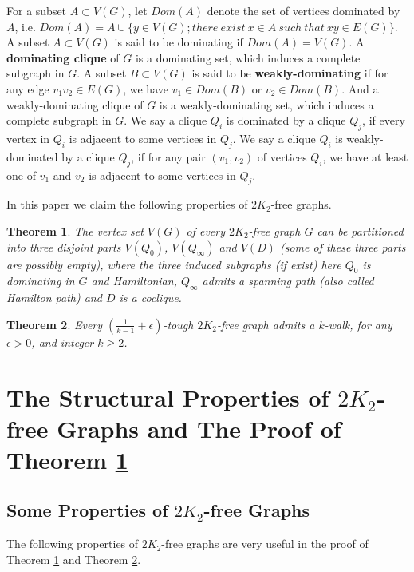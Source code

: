 \documentclass[12pt]{article}
\newtheorem{theorem}{Theorem}
\begin{document}
For a subset $A\subset V(G)$, let $Dom(A)$ denote the set of vertices dominated by $A$, i.e. $Dom(A)=A\cup\{y\in V(G); there~exist~x\in A~such~that~xy\in E(G)\}$. A subset $A\subset V(G)$ is said to be dominating if $Dom(A)=V(G)$. A {\bf dominating clique} of $G$ is a dominating set, which induces a complete subgraph in $G$. A subset $B\subset V(G)$ is said to be {\bf weakly-dominating} if for any edge $v_1v_2\in E(G)$, we have $v_1\in Dom(B)$ or $v_2\in Dom(B)$. And a weakly-dominating clique of $G$ is a weakly-dominating set, which induces a complete subgraph in $G$. We say a clique $Q_i$ is dominated by a clique $Q_j$, if every vertex in $Q_i$ is adjacent to some vertices in $Q_j$. We say a clique $Q_i$ is weakly-dominated by a clique $Q_j$, if for any pair $(v_1,v_2)$ of vertices $Q_i$, we have at least one of $v_1$ and $v_2$ is adjacent to some vertices in $Q_j$.






In this paper we claim the following properties of $2K_2$-free graphs.

\begin{theorem}\label{thm1}
The vertex set $V(G)$ of every $2K_2$-free graph $G$ can be partitioned into three disjoint parts $V(Q_0)$, $V(Q_{\infty})$ and $V(D)$ (some of these three parts are possibly empty), where the three induced subgraphs (if exist) here $Q_0$ is dominating in $G$ and Hamiltonian, $Q_{\infty}$ admits a spanning path (also called Hamilton path) and $D$ is a coclique.
\end{theorem}



\begin{theorem}\label{thm2}
Every $(\frac{1}{k-1}+\epsilon)$-tough $2K_2$-free graph admits a $k$-walk, for any $\epsilon>0$, and integer $k\ge2$.
\end{theorem}




\section{The Structural Properties of $2K_2$-free Graphs and The Proof of Theorem \ref{thm1}}
\subsection{Some Properties of $2K_2$-free Graphs}
The following properties of $2K_2$-free graphs are very useful in the proof of Theorem \ref{thm1} and Theorem \ref{thm2}.
\end{document}
